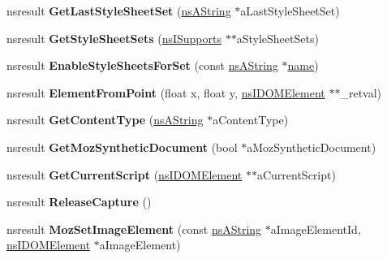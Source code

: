 \begin{DoxyCompactItemize}
nsresult {\bfseries Get\+Last\+Style\+Sheet\+Set} (\hyperlink{structns_string_container}{ns\+A\+String} $\ast$a\+Last\+Style\+Sheet\+Set)
\item 
\mbox{\label{interfacens_i_d_o_m_document_aa028e344187124c8f37e3610878ec858}} 
nsresult {\bfseries Get\+Style\+Sheet\+Sets} (\hyperlink{interfacens_i_supports}{ns\+I\+Supports} $\ast$$\ast$a\+Style\+Sheet\+Sets)
\item 
\mbox{\label{interfacens_i_d_o_m_document_a7bee7b23aa141dedbefb91219bec02ba}} 
nsresult {\bfseries Enable\+Style\+Sheets\+For\+Set} (const \hyperlink{structns_string_container}{ns\+A\+String} $\ast$\hyperlink{structname}{name})
\item 
\mbox{\label{interfacens_i_d_o_m_document_a7f1c9351b4739f037a537cded0f9a67c}} 
nsresult {\bfseries Element\+From\+Point} (float x, float y, \hyperlink{interfacens_i_d_o_m_element}{ns\+I\+D\+O\+M\+Element} $\ast$$\ast$\+\_\+retval)
\item 
\mbox{\label{interfacens_i_d_o_m_document_a969d1bd31ba0fa87ee795fb30904ea00}} 
nsresult {\bfseries Get\+Content\+Type} (\hyperlink{structns_string_container}{ns\+A\+String} $\ast$a\+Content\+Type)
\item 
\mbox{\label{interfacens_i_d_o_m_document_a0f5079e2d59d7229c1db963f6615e418}} 
nsresult {\bfseries Get\+Moz\+Synthetic\+Document} (bool $\ast$a\+Moz\+Synthetic\+Document)
\item 
\mbox{\label{interfacens_i_d_o_m_document_a1a111b307a8a4a682f4bcadfe24acd81}} 
nsresult {\bfseries Get\+Current\+Script} (\hyperlink{interfacens_i_d_o_m_element}{ns\+I\+D\+O\+M\+Element} $\ast$$\ast$a\+Current\+Script)
\item 
\mbox{\label{interfacens_i_d_o_m_document_a8a50c73c58abf90d5a2f017556106ccf}} 
nsresult {\bfseries Release\+Capture} ()
\item 
\mbox{\label{interfacens_i_d_o_m_document_ae7a0d474c7d8cd9c8c637361da0bcb19}} 
nsresult {\bfseries Moz\+Set\+Image\+Element} (const \hyperlink{structns_string_container}{ns\+A\+String} $\ast$a\+Image\+Element\+Id, \hyperlink{interfacens_i_d_o_m_element}{ns\+I\+D\+O\+M\+Element} $\ast$a\+Image\+Element)
$$
\end{DoxyCompactItemize}
